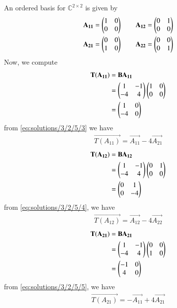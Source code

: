 An ordered basis for $\mathbb{C}^{2\times2}$ is given by
\begin{align}
& \mathbf{A_{11}} = \begin{pmatrix}1 & 0 \\ 0 & 0\end{pmatrix} \qquad \mathbf{A_{12}} = \begin{pmatrix}0 & 1 \\ 0 & 0\end{pmatrix} \\
& \mathbf{A_{21}} = \begin{pmatrix}0 & 0 \\ 1 & 0\end{pmatrix} \qquad \mathbf{A_{22}} = \begin{pmatrix}0 & 0 \\ 0 & 1\end{pmatrix}
\end{align}
Now, we compute
\begin{align}  
\mathbf{T(A_{11})} & = \mathbf{BA_{11}} \\
                & = \begin{pmatrix}1 & -1 \\ -4 & 4\end{pmatrix}\begin{pmatrix}1 & 0 \\ 0 & 0\end{pmatrix} \\
                & = \begin{pmatrix}1 & 0 \\ -4 & 0\end{pmatrix} \label{eq:solutions/3/2/5/3}
\end{align}
from \eqref{eq:solutions/3/2/5/3} we have
\begin{align}
\vec{T(A_{11})} = \vec{A_{11}} -4\vec{A_{21}}\label{eq:solutions/3/2/5/7}
\end{align}
\begin{align}  
	\mathbf{T(A_{12})} & = \mathbf{BA_{12}} \\
	& = \begin{pmatrix}1 & -1 \\ -4 & 4\end{pmatrix}\begin{pmatrix}0 & 1 \\ 0 & 0\end{pmatrix} \\
	& = \begin{pmatrix}0 & 1 \\ 0 & -4\end{pmatrix} \label{eq:solutions/3/2/5/4}
\end{align}
from \eqref{eq:solutions/3/2/5/4}, we have
\begin{align}
	\vec{T(A_{12})} = \vec{A_{12}} -4\vec{A_{22}}\label{eq:solutions/3/2/5/8}
\end{align}
\begin{align}  
	\mathbf{T(A_{21})} & = \mathbf{BA_{21}} \\
	& = \begin{pmatrix}1 & -1 \\ -4 & 4\end{pmatrix}\begin{pmatrix}0 & 0 \\ 1 & 0\end{pmatrix} \\
	& = \begin{pmatrix}-1 & 0 \\ 4 & 0\end{pmatrix} \label{eq:solutions/3/2/5/5}
\end{align}
from \eqref{eq:solutions/3/2/5/5}, we have 
\begin{align}
	\vec{T(A_{21})} = -\vec{A_{11}} + 4\vec{A_{21}}\label{eq:solutions/3/2/5/9}
\end{align}
